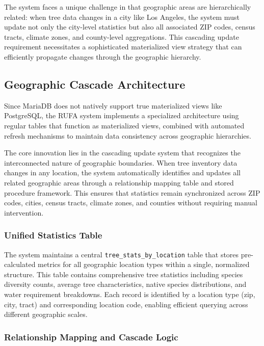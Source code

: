 The system faces a unique challenge in that geographic areas are hierarchically related: when tree data changes in a city like Los Angeles, the system must update not only the city-level statistics but also all associated ZIP codes, census tracts, climate zones, and county-level aggregations. This cascading update requirement necessitates a sophisticated materialized view strategy that can efficiently propagate changes through the geographic hierarchy.

\subsection{Geographic Cascade Architecture}

Since MariaDB does not natively support true materialized views like PostgreSQL, the RUFA system implements a specialized architecture using regular tables that function as materialized views, combined with automated refresh mechanisms to maintain data consistency across geographic hierarchies.

The core innovation lies in the cascading update system that recognizes the interconnected nature of geographic boundaries. When tree inventory data changes in any location, the system automatically identifies and updates all related geographic areas through a relationship mapping table and stored procedure framework. This ensures that statistics remain synchronized across ZIP codes, cities, census tracts, climate zones, and counties without requiring manual intervention.

\subsubsection{Unified Statistics Table}

The system maintains a central \texttt{tree\_stats\_by\_location} table that stores pre-calculated metrics for all geographic location types within a single, normalized structure. This table contains comprehensive tree statistics including species diversity counts, average tree characteristics, native species distributions, and water requirement breakdowns. Each record is identified by a location type (zip, city, tract) and corresponding location code, enabling efficient querying across different geographic scales.

\subsubsection{Relationship Mapping and Cascade Logic}

